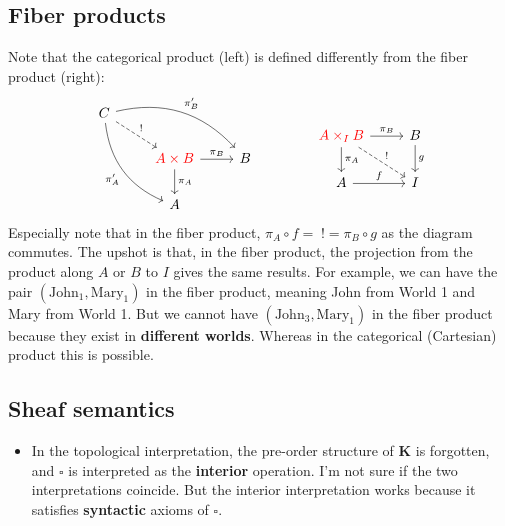 \begin{preview}
\begin{minipage}{\textwidth}
\begin{itemize}
\end{itemize}


\subsection{Fiber products}

Note that the categorical product (left) is defined differently from the fiber product (right):
\begin{equation}
\begin{tikzcd}
C \arrow[ddr,bend right,"\pi'_A"'] \arrow[drr,bend left,"\pi'_B"] \arrow[dr,dashed,"!"] \\
& {\color{red} A \times B} \arrow[r,"\pi_B"] \arrow[d,"\pi_A"] & B \\
& A & {}
\end{tikzcd}
\qquad \qquad
\begin{tikzcd}[]
{\color{red}A \times_I B} \arrow[r,"\pi_B"] \arrow[dr,dashed,"!"] \arrow[d,"\pi_A"] & B \arrow[d,"g"] \\
A \arrow[r,"f"] & I
\end{tikzcd}
\end{equation}
Especially note that in the fiber product, $ \pi_A \circ f = \; ! = \pi_B \circ g $ as the diagram commutes.  The upshot is that, in the fiber product, the projection from the product along $A$ or $B$ to $I$ gives the same results.  For example, we can have the pair $(\mathrm{John}_1, \mathrm{Mary}_1)$ in the fiber product, meaning John from World 1 and Mary from World 1.  But we cannot have $(\mathrm{John}_3, \mathrm{Mary}_1)$ in the fiber product  because they exist in \textbf{different worlds}.  Whereas in the categorical (Cartesian) product this is possible.

\subsection{Sheaf semantics}

\begin{itemize}
	\item In the topological interpretation, the pre-order structure of $\mathbf{K}$ is forgotten, and $\square$ is interpreted as the \textbf{interior} operation.  I'm not sure if the two interpretations coincide.  But the interior interpretation works because it satisfies \textbf{syntactic} axioms of $\square$.


\end{itemize}
\end{minipage}
\end{preview}
